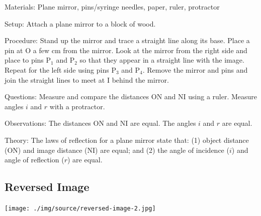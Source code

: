 \begin{multicols}{2}
\begin{description*}
\item[Materials:]{Plane mirror, pins/syringe needles, paper, ruler, protractor}
\item[Setup:]{Attach a plane mirror to a block of wood.}
\item[Procedure:]{Stand up the mirror and trace a straight line along its base. Place a pin at O a few cm from the mirror. Look at the mirror from the right side and place to pins P$_1$ and P$_2$ so that they appear in a straight line with the image. Repeat for the left side using pins P$_3$ and P$_4$. Remove the mirror and pins and join the straight lines to meet at I behind the mirror.}
\item[Questions:]{Measure and compare the distances ON and NI using a ruler. Measure angles $i$ and $r$ with a protractor.}
\item[Observations:]{The distances ON and NI are equal. The angles $i$ and $r$ are equal.}
\item[Theory:]{The laws of reflection for a plane mirror state that: (1) object distance (ON) and image distance (NI) are equal; and (2) the angle of incidence ($i$) and angle of reflection ($r$) are equal.}
\end{description*}

\vfill
\columnbreak

\subsection{Reversed Image}

\begin{center}
\texttt{[image: ./img/source/reversed-image-2.jpg]}
\end{center}


\end{multicols}
